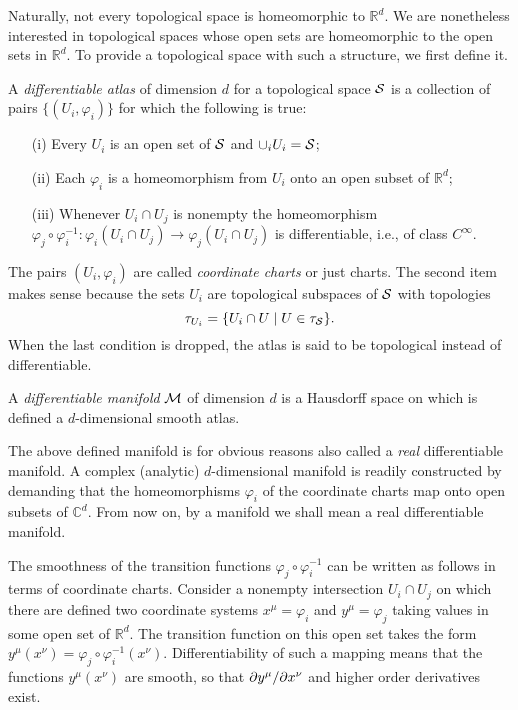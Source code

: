 \documentclass[
final,
11pt,
a4paper,
DIV=11,
headinclude=true,
footinclude=false,
bibliography=totoc,
twoside=true,  %
BCOR=5mm
]{scrbook}
\begin{document}
Naturally, not every topological space is homeomorphic to 
$\mathds{R}^d$. We are nonetheless interested in topological 
spaces whose open sets are homeomorphic to the open sets in 
$\mathds{R}^d$. To provide a topological space with such a 
structure, we first define it.

\begin{definition}
A \emph{differentiable atlas} of dimension $d$ for a topological 
space $\mathcal{S}$ is a collection of pairs $\{(U_i,\varphi_i)\}$ for 
which the following is true:
\begin{itemize}
  \item[(i)] Every $U_i$ is an open set of $\mathcal{S}$ and $\cup_i 
    U_i = \mathcal{S}$;
  \item[(ii)] Each $\varphi_i$ is a homeomorphism from $U_i$ onto 
    an open subset of $\mathds{R}^d$;
  \item[(iii)] Whenever $U_i \cap U_j$ is nonempty the 
    homeomorphism $\varphi_j \circ \varphi_i^{-1} : \varphi_i(U_i 
    \cap U_j) \to \varphi_j(U_i \cap U_j)$ is differentiable, 
    i.e., of class $C^\infty$.
\end{itemize}
The pairs $(U_i,\varphi_i)$ are called \emph{coordinate charts} 
or just charts. The second item makes sense because the sets 
$U_i$ are topological subspaces of $\mathcal{S}$ with topologies
\begin{equation*}
  \tau_{U_i} = \{U_i \cap U \mid U \in \tau_\mathcal{S}\}.
\end{equation*}
When the last condition is dropped, the atlas is said to be 
topological instead of differentiable.
\end{definition}

\begin{definition}
A \emph{differentiable manifold} $\mathcal{M}$ of dimension $d$ is a 
Hausdorff space on which is defined a $d$-dimensional smooth 
atlas.
\end{definition}

The above defined manifold is for obvious reasons also called a 
\emph{real} differentiable manifold. A complex (analytic) 
$d$-dimensional manifold is readily constructed by demanding that 
the homeomorphisms $\varphi_i$ of the coordinate charts map onto 
open subsets of $\mathds{C}^d$. From now on, by a manifold we 
shall mean a real differentiable manifold.

The smoothness of the transition functions $\varphi_j \circ 
\varphi_i^{-1}$ can be written as follows in terms of coordinate 
charts. Consider a nonempty intersection $U_i \cap U_j$ on which 
there are defined two coordinate systems $x^\mu = \varphi_i$ and 
$y^\mu = \varphi_j$ taking values in some open set of 
$\mathds{R}^d$. The transition function on this open set takes 
the form $y^\mu(x^\nu) = \varphi_j \circ \varphi_i^{-1}(x^\nu)$.  
Differentiability of such a mapping means that the functions 
$y^\mu(x^\nu)$ are smooth, so that $\partial y^\mu/\partial x^\nu$ and 
higher order derivatives exist.
\end{document}
